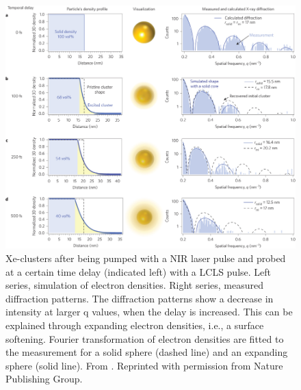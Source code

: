 \begin{figure}
	\centering
		\includegraphics[width=1.00\textwidth]{images/tais-nat-photonics.jpg}
	\caption[Measurement and simulation of the nanoplasma expansion in Xe-clusters.]{Xe-clusters after being pumped with a NIR laser pulse and probed at a certain time delay (indicated left) with a LCLS pulse. Left series, simulation of electron densities. Right series, measured diffraction patterns. The diffraction patterns show a decrease in intensity at larger q values, when the delay is increased. This can be explained through expanding electron densities, i.e., a surface softening. Fourier transformation of electron densities are fitted to the measurement for a solid sphere (dashed line) and an expanding sphere (solid line). From \citep{Gorkhover-2016-NatPho}. Reprinted with permission from Nature Publishing Group.}
	\label{fig:tais-nat-photonics}
\end{figure}

